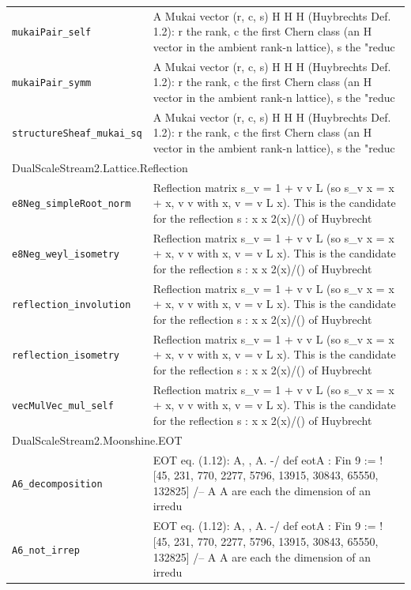 \begin{longtable}{p{}p{}}
\quad\texttt{\footnotesize mukaiPair\_self} & {\footnotesize A Mukai vector (r, c, s)  H  H  H (Huybrechts Def. 1.2): r the rank, c the first Chern class (an H vector in the ambient rank-n lattice), s the "reduc} \\
\quad\texttt{\footnotesize mukaiPair\_symm} & {\footnotesize A Mukai vector (r, c, s)  H  H  H (Huybrechts Def. 1.2): r the rank, c the first Chern class (an H vector in the ambient rank-n lattice), s the "reduc} \\
\quad\texttt{\footnotesize structureSheaf\_mukai\_sq} & {\footnotesize A Mukai vector (r, c, s)  H  H  H (Huybrechts Def. 1.2): r the rank, c the first Chern class (an H vector in the ambient rank-n lattice), s the "reduc} \\
\multicolumn{2}{l}{\textsf{\small DualScaleStream2.Lattice.Reflection}} \\
\quad\texttt{\footnotesize e8Neg\_simpleRoot\_norm} & {\footnotesize Reflection matrix s\_v = 1 + v v L (so s\_v x = x + x, v v with x, v = v L x). This is the candidate for the reflection s : x  x  2(x)/()   of Huybrecht} \\
\quad\texttt{\footnotesize e8Neg\_weyl\_isometry} & {\footnotesize Reflection matrix s\_v = 1 + v v L (so s\_v x = x + x, v v with x, v = v L x). This is the candidate for the reflection s : x  x  2(x)/()   of Huybrecht} \\
\quad\texttt{\footnotesize reflection\_involution} & {\footnotesize Reflection matrix s\_v = 1 + v v L (so s\_v x = x + x, v v with x, v = v L x). This is the candidate for the reflection s : x  x  2(x)/()   of Huybrecht} \\
\quad\texttt{\footnotesize reflection\_isometry} & {\footnotesize Reflection matrix s\_v = 1 + v v L (so s\_v x = x + x, v v with x, v = v L x). This is the candidate for the reflection s : x  x  2(x)/()   of Huybrecht} \\
\quad\texttt{\footnotesize vecMulVec\_mul\_self} & {\footnotesize Reflection matrix s\_v = 1 + v v L (so s\_v x = x + x, v v with x, v = v L x). This is the candidate for the reflection s : x  x  2(x)/()   of Huybrecht} \\
\multicolumn{2}{l}{\textsf{\small DualScaleStream2.Moonshine.EOT}} \\
\quad\texttt{\footnotesize A6\_decomposition} & {\footnotesize EOT eq. (1.12): A, , A. -/ def eotA : Fin 9   := ![45, 231, 770, 2277, 5796, 13915, 30843, 65550, 132825] /-- A  A are each the dimension of an irredu} \\
\quad\texttt{\footnotesize A6\_not\_irrep} & {\footnotesize EOT eq. (1.12): A, , A. -/ def eotA : Fin 9   := ![45, 231, 770, 2277, 5796, 13915, 30843, 65550, 132825] /-- A  A are each the dimension of an irredu} \\

\end{longtable}
